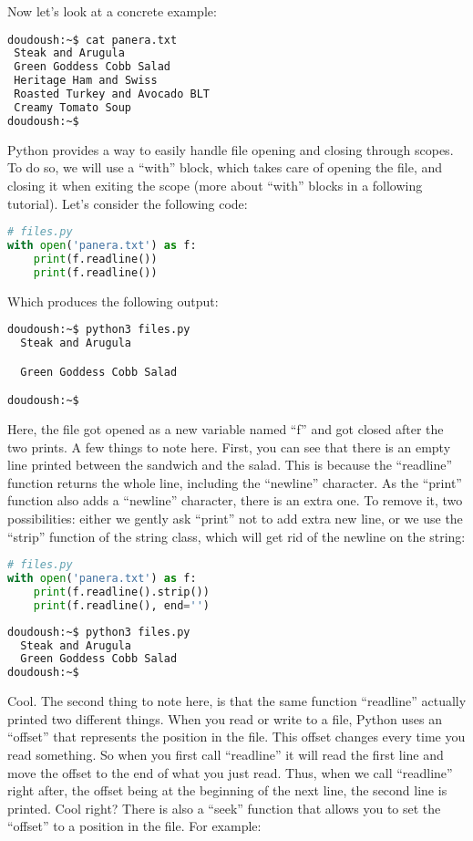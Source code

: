 Now let's look at a concrete example:

\begin{lstlisting}[language=bash]
doudoush:~$ cat panera.txt
 Steak and Arugula
 Green Goddess Cobb Salad
 Heritage Ham and Swiss
 Roasted Turkey and Avocado BLT
 Creamy Tomato Soup
doudoush:~$
\end{lstlisting}

Python provides a way to easily handle file opening and closing through scopes.
To do so, we will use a ``with'' block, which takes care of opening the file,
and closing it when exiting the scope (more about ``with'' blocks in a following
tutorial). Let's consider the following code:

\begin{lstlisting}[language=python]
# files.py
with open('panera.txt') as f:
    print(f.readline())
    print(f.readline())
\end{lstlisting}

Which produces the following output:

\begin{lstlisting}[language=bash]
doudoush:~$ python3 files.py
  Steak and Arugula

  Green Goddess Cobb Salad

doudoush:~$
\end{lstlisting}

Here, the file got opened as a new variable named ``f'' and got closed after the
two prints. A few things to note here. First, you can see that there is an empty line
printed between the sandwich and the salad. This is because the ``readline''
function returns the whole line, including the ``newline'' character. As the
``print'' function also adds a ``newline'' character, there is an extra one.
To remove it, two possibilities: either we gently ask ``print'' not to add extra
new line, or we use the ``strip'' function of the string class, which will get
rid of the newline on the string:

\begin{lstlisting}[language=python]
# files.py
with open('panera.txt') as f:
    print(f.readline().strip())
    print(f.readline(), end='')
\end{lstlisting}

\begin{lstlisting}[language=bash]
doudoush:~$ python3 files.py
  Steak and Arugula
  Green Goddess Cobb Salad
doudoush:~$
\end{lstlisting}

Cool. The second thing to note here, is that the same function ``readline''
actually printed two different things. When you read or write to a file, Python
uses an ``offset'' that represents the position in the file. This offset changes
every time you read something. So when you first call ``readline'' it will read
the first line and move the offset to the end of what you just read. Thus, when
we call ``readline'' right after, the offset being at the beginning of the next
line, the second line is printed. Cool right? There is also a ``seek'' function
that allows you to set the ``offset'' to a position in the file. For example:

